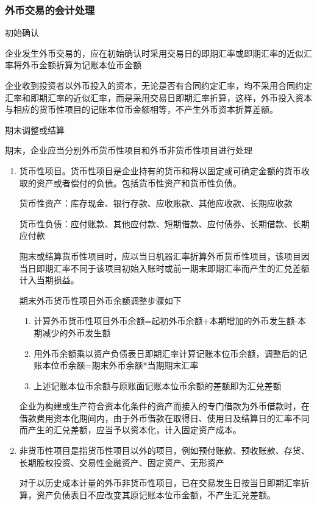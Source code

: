\documentclass[UTF8,12pt]{ctexart}
\numberwithin{equation}{section} %
\numberwithin{figure}{section}
\numberwithin{table}{section}
\begin{document}
	\subsubsection{外币交易的会计处理}
	初始确认
	
	企业发生外币交易的，应在初始确认时采用交易日的即期汇率或即期汇率的近似汇率将外币金额折算为记账本位币金额
	
	企业收到投资者以外币投入的资本，无论是否有合同约定汇率，均不采用合同约定汇率和即期汇率的近似汇率，而是采用交易日即期汇率折算，这样，外币投入资本与相应的货币性项目的记账本位币金额相等，不产生外币资本折算差额。
	
	期末调整或结算
	
	期末，企业应当分别外币货币性项目和外币非货币性项目进行处理
	\begin{enumerate}
		\item 货币性项目。货币性项目是企业持有的货币和将以固定或可确定金额的货币收取的资产或者偿付的负债。包括货币性资产和货币性负债。
		
		货币性资产：库存现金、银行存款、应收账款、其他应收款、长期应收款
		
		货币性负债：应付账款、其他应付款、短期借款、应付债券、长期借款、长期应付款
		
		期末或结算货币性项目时，应以当日机器汇率折算外币货币性项目，该项目因当日即期汇率不同于该项目初始入账时或前一期末即期汇率而产生的汇兑差额计入当期损益。
		
		期末外币货币性项目外币余额调整步骤如下
		\begin{enumerate}
			\item 计算外币货币性项目外币余额=起初外币余额+本期增加的外币发生额-本期减少的外币发生额
			
			\item 用外币余额乘以资产负债表日即期汇率计算记账本位币余额，调整后的记账本位币余额=期末外币余额*当期期末汇率
			
			\item 上述记账本位币余额与原账面记账本位币余额的差额即为汇兑差额
		\end{enumerate}
		
		企业为构建或生产符合资本化条件的资产而接入的专门借款为外币借款时，在借款费用资本化期间内，由于外币借款在取得日、使用日及结算日的汇率不同而产生的汇兑差额，应当予以资本化，计入固定资产成本。
		
		\item 非货币性项目是指货币性项目以外的项目，例如预付账款、预收账款、存货、长期股权投资、交易性金融资产、固定资产、无形资产
		
		对于以历史成本计量的外币非货币性项目，已在交易发生日按当日即期汇率折算，资产负债表日不应改变其原记账本位币金额，不产生汇兑差额。
		

\end{enumerate}
\end{document}
